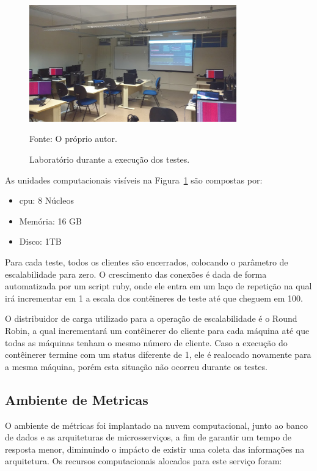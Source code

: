 \begin{figure}[htb!]
  \caption{Laboratório durante a execução dos testes.}
  \label{fig:laboratorio}
  \includegraphics[width=0.8\textwidth]{figuras/network/lab.jpg}
  \centering

  Fonte: O próprio autor.
\end{figure}

As unidades computacionais visíveis na Figura~\ref{fig:laboratorio} são compostas por:

\begin{itemize}
  \item \ac{cpu}: 8 Núcleos
  \item Memória: 16 GB
  \item Disco: 1TB
\end{itemize}

Para cada teste, todos os clientes são encerrados, colocando o parâmetro de escalabilidade para zero.
%
O crescimento das conexões é dada de forma automatizada por um script ruby, onde ele entra em um laço de repetição na qual irá incrementar em 1 a escala dos contêineres de teste até que cheguem em 100.

O distribuidor de carga utilizado para a operação de escalabilidade é o Round Robin, a qual incrementará um contêinerer do cliente para cada máquina até que todas as máquinas tenham o mesmo número de cliente.
%
Caso a execução do contêinerer termine com um status diferente de 1, ele é realocado novamente para a mesma máquina, porém esta situação não ocorreu durante os testes.

\subsection{Ambiente de Metricas}
\label{sec:ambiente_met}

O ambiente de métricas foi implantado na nuvem computacional, junto ao banco de dados e as arquiteturas de microsserviços, a fim de garantir um tempo de resposta menor, diminuindo o impácto de existir uma coleta das informações na arquitetura.
%
Os recursos computacionais alocados para este serviço foram:

